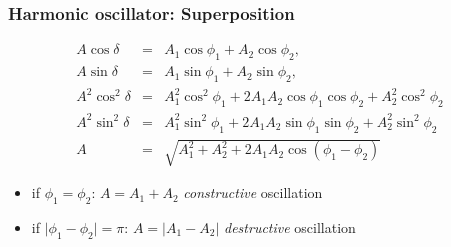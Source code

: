 \documentclass[t,aspectratio=169]{beamer}
\begin{document}

\begin{frame}
\frametitle{Harmonic oscillator: Superposition}
\begin{eqnarray*}
A\cos\delta&=&A_{1}\cos\phi_{1}+A_{2}\cos\phi_{2}, \\
A\sin\delta&=&A_{1}\sin\phi_{1}+A_{2}\sin\phi_{2},\\
A^{2}\cos^{2}\delta&=&A_{1}^{2}\cos^{2}\phi_{1}+2A_{1}A_{2}\cos\phi_{1}\cos\phi_{2}+A_{2}^{2}\cos^{2}\phi_{2} \\
A^{2}\sin^{2}\delta&=&A_{1}^{2}\sin^{2}\phi_{1}+2A_{1}A_{2}\sin\phi_{1}\sin\phi_{2}+A_{2}^{2}\sin^{2}\phi_{2} \\
A&=&\sqrt{A_{1}^{2}+A_{2}^{2}+2A_{1}A_{2}\cos(\phi_{1}-\phi_{2})}
\end{eqnarray*}             
\begin{itemize}
\item if $\phi_{1}=\phi_{2}$: $A=A_{1}+A_{2}$ \emph{constructive} oscillation
\item if $\vert\phi_{1}-\phi_{2}\vert=\pi$: $A=\vert A_{1}-A_{2}\vert$ \emph{destructive} oscillation
\end{itemize}
\end{frame}

\end{document}
